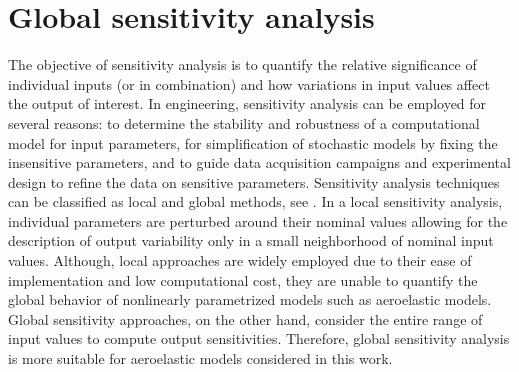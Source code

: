 \documentclass[review]{elsarticle}
\numberwithin{equation}{section}
\numberwithin{equation}{section}
\begin{document}
\section{Global sensitivity analysis}\label{sec:GSA}
The objective of sensitivity analysis is to quantify the relative significance of individual inputs (or in combination) and how variations in input values affect the output of interest. In engineering, sensitivity analysis can be employed for several reasons: to determine the stability and robustness of a computational model for input parameters, for simplification of stochastic models by fixing the insensitive parameters, and to guide data acquisition campaigns and experimental design to refine the data on sensitive parameters. Sensitivity analysis techniques can be classified as local and global methods, see \cite{RSmith}. In a local sensitivity analysis, individual parameters are perturbed around their nominal values allowing for the description of output variability only in a small neighborhood of nominal input values. Although, local approaches are widely employed due to their ease of implementation and low computational cost, they are unable to quantify the global behavior of nonlinearly parametrized models such as aeroelastic models. Global sensitivity approaches, on the other hand, consider the entire range of input values to compute output sensitivities. Therefore, global sensitivity analysis is more suitable for aeroelastic models considered in this work.  
\end{document}
